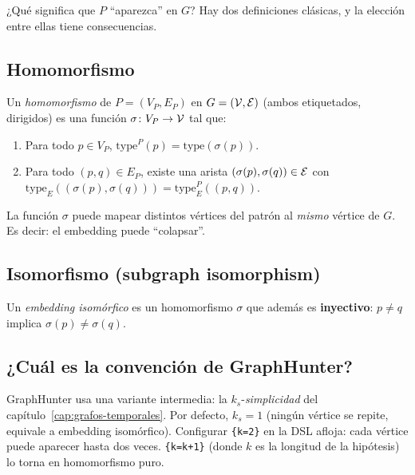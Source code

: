 ¿Qué significa que \(P\) ``aparezca'' en \(G\)? Hay dos definiciones
clásicas, y la elección entre ellas tiene consecuencias.

\subsection{Homomorfismo}

\begin{definition}
Un \emph{homomorfismo} de \(P = (V_P, E_P)\) en \(G = (\mathcal{V}, \mathcal{E})\)
(ambos etiquetados, dirigidos) es una función
\(\sigma \colon V_P \to \mathcal{V}\) tal que:
\begin{enumerate}
    \item Para todo \(p \in V_P\), \(\mathrm{type}^P(p) =
    \mathrm{type}(\sigma(p))\).
    \item Para todo \((p, q) \in E_P\), existe una arista
    \((\sigma(p), \sigma(q)) \in \mathcal{E}\) con
    \(\mathrm{type}_E((\sigma(p), \sigma(q))) =
    \mathrm{type}_E^P((p, q))\).
\end{enumerate}
\end{definition}

\noindent
La función \(\sigma\) puede mapear distintos vértices del patrón al
\emph{mismo} vértice de \(G\). Es decir: el embedding puede
``colapsar''.

\subsection{Isomorfismo (subgraph isomorphism)}

\begin{definition}
Un \emph{embedding isomórfico} es un homomorfismo \(\sigma\) que
además es \textbf{inyectivo}: \(p \neq q\) implica \(\sigma(p) \neq
\sigma(q)\).
\end{definition}

\subsection{¿Cuál es la convención de GraphHunter?}

GraphHunter usa una variante intermedia: la \(k_s\)-\emph{simplicidad}
del capítulo~\ref{cap:grafos-temporales}. Por defecto, \(k_s = 1\)
(ningún vértice se repite, equivale a embedding isomórfico).
Configurar \texttt{\{k=2\}} en la DSL afloja: cada vértice puede
aparecer hasta dos veces. \texttt{\{k=k+1\}} (donde \(k\) es la
longitud de la hipótesis) lo torna en homomorfismo puro.

